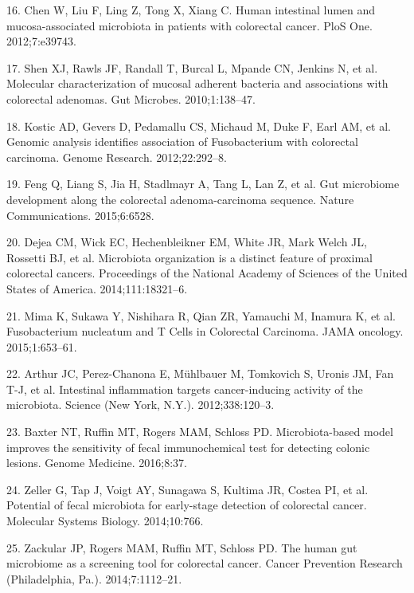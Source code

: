 \documentclass[12pt,]{article}
\begin{document}
\hypertarget{ref-chen_human_2012}{}
16. Chen W, Liu F, Ling Z, Tong X, Xiang C. Human intestinal lumen and
mucosa-associated microbiota in patients with colorectal cancer. PloS
One. 2012;7:e39743.

\hypertarget{ref-shen_molecular_2010}{}
17. Shen XJ, Rawls JF, Randall T, Burcal L, Mpande CN, Jenkins N, et al.
Molecular characterization of mucosal adherent bacteria and associations
with colorectal adenomas. Gut Microbes. 2010;1:138--47.

\hypertarget{ref-kostic_genomic_2012}{}
18. Kostic AD, Gevers D, Pedamallu CS, Michaud M, Duke F, Earl AM, et
al. Genomic analysis identifies association of Fusobacterium with
colorectal carcinoma. Genome Research. 2012;22:292--8.

\hypertarget{ref-feng_gut_2015}{}
19. Feng Q, Liang S, Jia H, Stadlmayr A, Tang L, Lan Z, et al. Gut
microbiome development along the colorectal adenoma-carcinoma sequence.
Nature Communications. 2015;6:6528.

\hypertarget{ref-dejea_microbiota_2014}{}
20. Dejea CM, Wick EC, Hechenbleikner EM, White JR, Mark Welch JL,
Rossetti BJ, et al. Microbiota organization is a distinct feature of
proximal colorectal cancers. Proceedings of the National Academy of
Sciences of the United States of America. 2014;111:18321--6.

\hypertarget{ref-mima_fusobacterium_2015}{}
21. Mima K, Sukawa Y, Nishihara R, Qian ZR, Yamauchi M, Inamura K, et
al. Fusobacterium nucleatum and T Cells in Colorectal Carcinoma. JAMA
oncology. 2015;1:653--61.

\hypertarget{ref-arthur_intestinal_2012}{}
22. Arthur JC, Perez-Chanona E, Mühlbauer M, Tomkovich S, Uronis JM, Fan
T-J, et al. Intestinal inflammation targets cancer-inducing activity of
the microbiota. Science (New York, N.Y.). 2012;338:120--3.

\hypertarget{ref-baxter_microbiota-based_2016}{}
23. Baxter NT, Ruffin MT, Rogers MAM, Schloss PD. Microbiota-based model
improves the sensitivity of fecal immunochemical test for detecting
colonic lesions. Genome Medicine. 2016;8:37.

\hypertarget{ref-zeller_potential_2014}{}
24. Zeller G, Tap J, Voigt AY, Sunagawa S, Kultima JR, Costea PI, et al.
Potential of fecal microbiota for early-stage detection of colorectal
cancer. Molecular Systems Biology. 2014;10:766.

\hypertarget{ref-zackular_human_2014}{}
25. Zackular JP, Rogers MAM, Ruffin MT, Schloss PD. The human gut
microbiome as a screening tool for colorectal cancer. Cancer Prevention
Research (Philadelphia, Pa.). 2014;7:1112--21.
\end{document}
